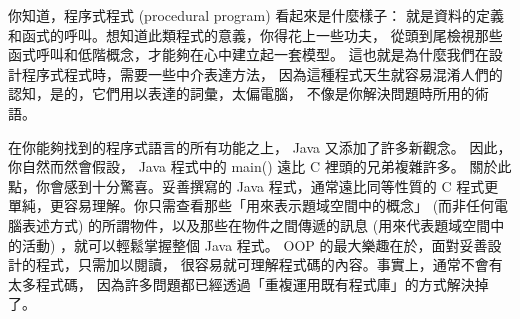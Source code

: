 你知道，程序式程式 (procedural program) 看起來是什麼樣子：
就是資料的定義和函式的呼叫。想知道此類程式的意義，你得花上一些功夫，
從頭到尾檢視那些函式呼叫和低階概念，才能夠在心中建立起一套模型。
這也就是為什麼我們在設計程序式程式時，需要一些中介表達方法，
因為這種程式天生就容易混淆人們的認知，是的，它們用以表達的詞彙，太偏電腦，
不像是你解決問題時所用的術語。

在你能夠找到的程序式語言的所有功能之上， Java 又添加了許多新觀念。
因此，你自然而然會假設， Java 程式中的 main() 遠比 C 裡頭的兄弟複雜許多。
關於此點，你會感到十分驚喜。妥善撰寫的 Java 程式，通常遠比同等性質的 C
程式更單純，更容易理解。你只需查看那些「用來表示題域空間中的概念」
(而非任何電腦表述方式) 的所謂物件，以及那些在物件之間傳遞的訊息
(用來代表題域空間中的活動) ，就可以輕鬆掌握整個 Java 程式。
OOP 的最大樂趣在於，面對妥善設計的程式，只需加以閱讀，
很容易就可理解程式碼的內容。事實上，通常不會有太多程式碼，
因為許多問題都已經透過「重複運用既有程式庫」的方式解決掉了。
